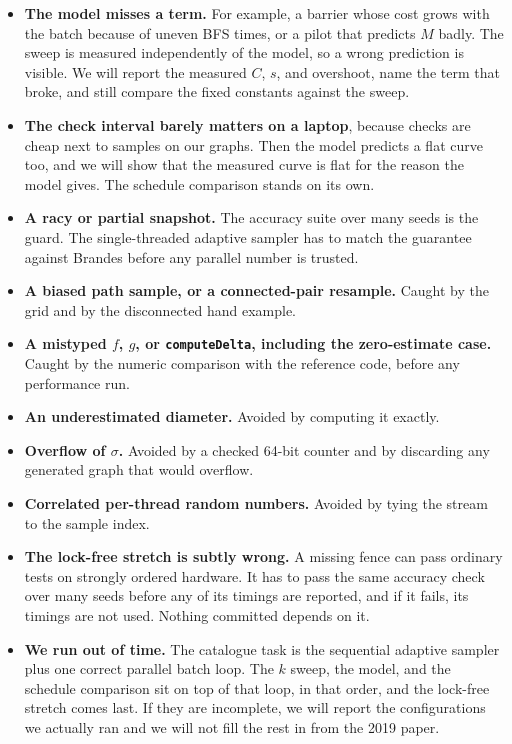 \documentclass[11pt]{article}
\begin{document}
\begin{itemize}
\item \textbf{The model misses a term.} For example, a barrier whose cost grows with the batch because of uneven BFS times, or a pilot that predicts $M$ badly. The sweep is measured independently of the model, so a wrong prediction is visible. We will report the measured $C$, $s$, and overshoot, name the term that broke, and still compare the fixed constants against the sweep.
\item \textbf{The check interval barely matters on a laptop}, because checks are cheap next to samples on our graphs. Then the model predicts a flat curve too, and we will show that the measured curve is flat for the reason the model gives. The schedule comparison stands on its own.
\item \textbf{A racy or partial snapshot.} The accuracy suite over many seeds is the guard. The single-threaded adaptive sampler has to match the guarantee against Brandes before any parallel number is trusted.
\item \textbf{A biased path sample, or a connected-pair resample.} Caught by the grid and by the disconnected hand example.
\item \textbf{A mistyped $f$, $g$, or \texttt{computeDelta}, including the zero-estimate case.} Caught by the numeric comparison with the reference code, before any performance run.
\item \textbf{An underestimated diameter.} Avoided by computing it exactly.
\item \textbf{Overflow of $\sigma$.} Avoided by a checked 64-bit counter and by discarding any generated graph that would overflow.
\item \textbf{Correlated per-thread random numbers.} Avoided by tying the stream to the sample index.
\item \textbf{The lock-free stretch is subtly wrong.} A missing fence can pass ordinary tests on strongly ordered hardware. It has to pass the same accuracy check over many seeds before any of its timings are reported, and if it fails, its timings are not used. Nothing committed depends on it.
\item \textbf{We run out of time.} The catalogue task is the sequential adaptive sampler plus one correct parallel batch loop. The $k$ sweep, the model, and the schedule comparison sit on top of that loop, in that order, and the lock-free stretch comes last. If they are incomplete, we will report the configurations we actually ran and we will not fill the rest in from the 2019 paper.
\end{itemize}
\end{document}
